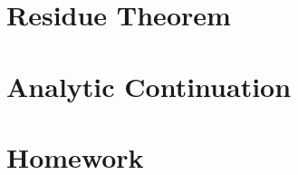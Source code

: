 \documentclass[CJK]{beamer}
\begin{document}
\section{Residue Theorem}

\begin{frame}
  \bch

  \ech
\end{frame}

\section{Analytic Continuation}

\begin{frame}
  \bch

  \ech
\end{frame}

\section{Homework}
\end{document}
